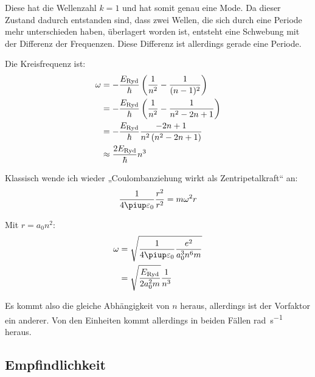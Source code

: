 Diese hat die Wellenzahl $k = 1$ und hat somit genau eine Mode. Da dieser
Zustand dadurch entstanden sind, dass zwei Wellen, die sich durch eine Periode
mehr unterschieden haben, überlagert worden ist, entsteht eine Schwebung mit
der Differenz der Frequenzen. Diese Differenz ist allerdings gerade eine
Periode.

Die Kreisfrequenz ist:
\begin{align*}
	\omega
	&= - \frac{E_\text{Ryd}}\hbar \del{\frac1{n^2} - \frac1{(n-1)^2}} \\
	&= - \frac{E_\text{Ryd}}\hbar \del{\frac1{n^2} - \frac1{n^2 - 2n + 1}} \\
	&= - \frac{E_\text{Ryd}}\hbar \frac{-2n + 1}{n^2 \del{n^2 - 2n + 1}} \\
	&\approx \frac{2E_\text{Ryd}}\hbar {n^3} \\
\end{align*}

Klassisch wende ich wieder „Coulombanziehung wirkt als Zentripetalkraft“ an:
\[
	\frac{1}{4\piup \varepsilon_0} \frac{r^2}{r^2} = m \omega^2 r
\]

Mit $r = a_0 n^2$:
\begin{align*}
	\omega &= \sqrt{\frac{1}{4\piup \varepsilon_0} \frac{e^2}{a_0^3 n^6 m}} \\
					   &= \sqrt{\frac{E_\text{Ryd}}{2a_0^2m}} \frac{1}{n^3}
\end{align*}

Es kommt also die gleiche Abhängigkeit von $n$ heraus, allerdings ist der
Vorfaktor ein anderer. Von den Einheiten kommt allerdings in beiden Fällen
\si{\radian\per\second} heraus.

\fehlt

\subsection{Empfindlichkeit}

\fehlt


\IfFileExists{\bibliographyfile}{
}{}



